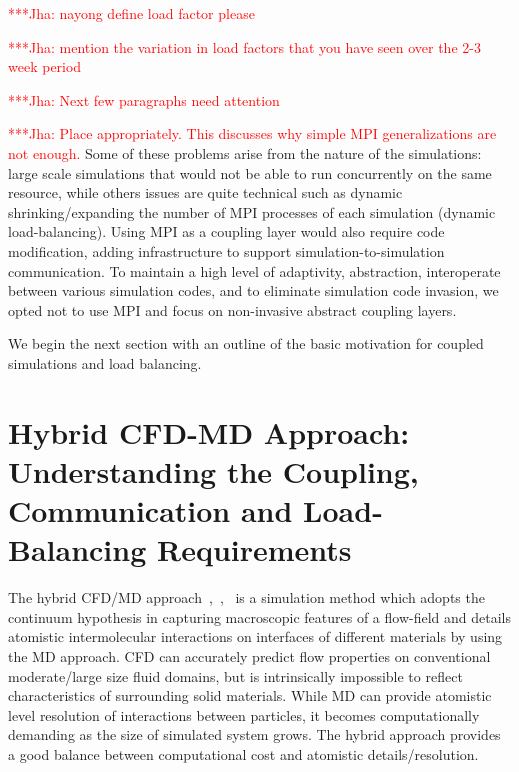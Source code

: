 \documentclass[conference,final]{IEEEtran}
\newcommand{\jhanote}[1]{ {\textcolor{red} { ***Jha: #1 }}}
\newcommand{\jhanote}[1]{}
\begin{document}
\jhanote{nayong define load factor please}

\jhanote{mention the variation in load factors that you have seen over
  the 2-3 week period}

\jhanote{Next few paragraphs need attention}


\jhanote{Place appropriately. This discusses why simple MPI
  generalizations are not enough.} Some of these problems arise from
the nature of the simulations: large scale simulations that would not
be able to run concurrently on the same resource, while others issues
are quite technical such as dynamic shrinking/expanding the number of
MPI processes of each simulation (dynamic load-balancing). Using MPI
as a coupling layer would also require code modification, adding
infrastructure to support simulation-to-simulation communication. To
maintain a high level of adaptivity, abstraction, interoperate between
various simulation codes, and to eliminate simulation code invasion,
we opted not to use MPI and focus on non-invasive abstract coupling
layers.

We begin the next section with an outline of the basic motivation for
coupled simulations and load balancing.


\section{Hybrid CFD-MD Approach: Understanding the Coupling,
  Communication and Load-Balancing Requirements}

The hybrid CFD/MD approach~\cite{Thompson},~\cite{Nie},~\cite{Yen} is
a simulation method which adopts the continuum hypothesis in capturing
macroscopic features of a flow-field and details atomistic
intermolecular interactions on interfaces of different materials by
using the MD approach. CFD can accurately predict flow properties on
conventional moderate/large size fluid domains, but is intrinsically
impossible to reflect characteristics of surrounding solid materials.
While MD can provide atomistic level resolution of interactions
between particles, it becomes computationally demanding as the size of
simulated system grows. The hybrid approach provides a good balance
between computational cost and atomistic details/resolution.

\end{document}
